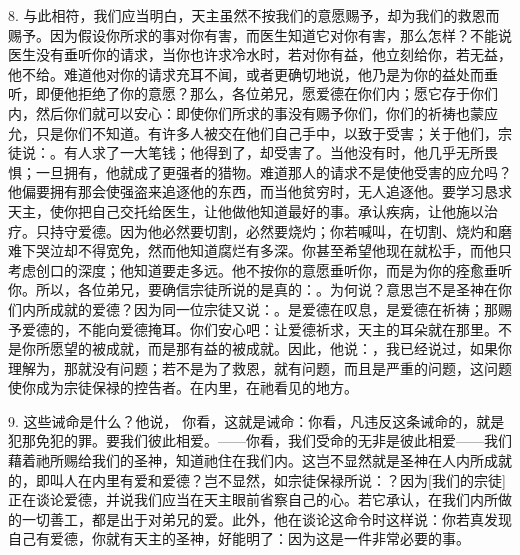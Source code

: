 8. 与此相符，我们应当明白，天主虽然不按我们的意愿赐予，却为我们的救恩而赐予。因为假设你所求的事对你有害，而医生知道它对你有害，那么怎样？不能说医生没有垂听你的请求，当你也许求冷水时，若对你有益，他立刻给你，若无益，他不给。难道他对你的请求充耳不闻，或者更确切地说，他乃是为你的益处而垂听，即便他拒绝了你的意愿？那么，各位弟兄，愿爱德在你们内；愿它存于你们内，然后你们就可以安心：即使你们所求的事没有赐予你们，你们的祈祷也蒙应允，只是你们不知道。有许多人被交在他们自己手中，以致于受害；关于他们，宗徒说：。有人求了一大笔钱；他得到了，却受害了。当他没有时，他几乎无所畏惧；一旦拥有，他就成了更强者的猎物。难道那人的请求不是使他受害的应允吗？他偏要拥有那会使强盗来追逐他的东西，而当他贫穷时，无人追逐他。要学习恳求天主，使你把自己交托给医生，让他做他知道最好的事。承认疾病，让他施以治疗。只持守爱德。因为他必然要切割，必然要烧灼；你若喊叫，在切割、烧灼和磨难下哭泣却不得宽免，然而他知道腐烂有多深。你甚至希望他现在就松手，而他只考虑创口的深度；他知道要走多远。他不按你的意愿垂听你，而是为你的痊愈垂听你。所以，各位弟兄，要确信宗徒所说的是真的：。为何说？意思岂不是圣神在你们内所成就的爱德？因为同一位宗徒又说：。是爱德在叹息，是爱德在祈祷；那赐予爱德的，不能向爱德掩耳。你们安心吧：让爱德祈求，天主的耳朵就在那里。不是你所愿望的被成就，而是那有益的被成就。因此，他说：，我已经说过，如果你理解为，那就没有问题；若不是为了救恩，就有问题，而且是严重的问题，这问题使你成为宗徒保禄的控告者。在内里，在祂看见的地方。\par

9. 这些诫命是什么？他说， 你看，这就是诫命：你看，凡违反这条诫命的，就是犯那免犯的罪。要我们彼此相爱。——你看，我们受命的无非是彼此相爱——我们藉着祂所赐给我们的圣神，知道祂住在我们内。这岂不显然就是圣神在人内所成就的，即叫人在内里有爱和爱德？岂不显然，如宗徒保禄所说：？因为[我们的宗徒]正在谈论爱德，并说我们应当在天主眼前省察自己的心。若它承认，在我们内所做的一切善工，都是出于对弟兄的爱。此外，他在谈论这命令时这样说：你若真发现自己有爱德，你就有天主的圣神，好能明了：因为这是一件非常必要的事。\par


